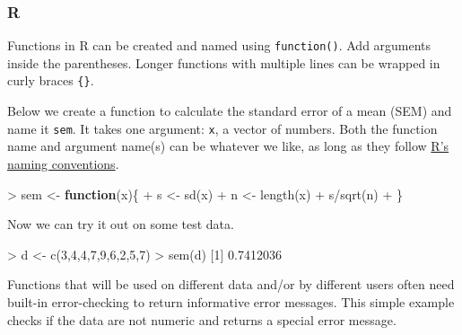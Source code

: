 \documentclass[
]{book}
\newenvironment{Shaded}{\begin{snugshade}}{\end{snugshade}}
\newcommand{\ControlFlowTok}[1]{\textcolor[rgb]{0.13,0.29,0.53}{\textbf{#1}}}
\newcommand{\DecValTok}[1]{\textcolor[rgb]{0.00,0.00,0.81}{#1}}
\newcommand{\FloatTok}[1]{\textcolor[rgb]{0.00,0.00,0.81}{#1}}
\newcommand{\FunctionTok}[1]{\textcolor[rgb]{0.00,0.00,0.00}{#1}}
\newcommand{\NormalTok}[1]{#1}
\newcommand{\OtherTok}[1]{\textcolor[rgb]{0.56,0.35,0.01}{#1}}
\newcommand{\SpecialCharTok}[1]{\textcolor[rgb]{0.00,0.00,0.00}{#1}}
\begin{document}
\hypertarget{r-7}{%
\subsubsection*{R}\label{r-7}}

Functions in R can be created and named using \texttt{function()}. Add arguments inside the parentheses. Longer functions with multiple lines can be wrapped in curly braces \texttt{\{\}}.

Below we create a function to calculate the standard error of a mean (SEM) and name it \texttt{sem}. It takes one argument: \texttt{x}, a vector of numbers. Both the function name and argument name(s) can be whatever we like, as long as they follow \href{https://cran.r-project.org/doc/manuals/r-release/R-intro.html\#R-commands_003b-case-sensitivity-etc}{R's naming conventions}.

\begin{Shaded}
\begin{Highlighting}[]
\SpecialCharTok{\textgreater{}}\NormalTok{ sem }\OtherTok{\textless{}{-}} \ControlFlowTok{function}\NormalTok{(x)\{}
\SpecialCharTok{+}\NormalTok{   s }\OtherTok{\textless{}{-}} \FunctionTok{sd}\NormalTok{(x)}
\SpecialCharTok{+}\NormalTok{   n }\OtherTok{\textless{}{-}} \FunctionTok{length}\NormalTok{(x)}
\SpecialCharTok{+}\NormalTok{   s}\SpecialCharTok{/}\FunctionTok{sqrt}\NormalTok{(n)}
\SpecialCharTok{+}\NormalTok{ \}}
\end{Highlighting}
\end{Shaded}

Now we can try it out on some test data.

\begin{Shaded}
\begin{Highlighting}[]
\SpecialCharTok{\textgreater{}}\NormalTok{ d }\OtherTok{\textless{}{-}} \FunctionTok{c}\NormalTok{(}\DecValTok{3}\NormalTok{,}\DecValTok{4}\NormalTok{,}\DecValTok{4}\NormalTok{,}\DecValTok{7}\NormalTok{,}\DecValTok{9}\NormalTok{,}\DecValTok{6}\NormalTok{,}\DecValTok{2}\NormalTok{,}\DecValTok{5}\NormalTok{,}\DecValTok{7}\NormalTok{)}
\SpecialCharTok{\textgreater{}} \FunctionTok{sem}\NormalTok{(d)}
\NormalTok{[}\DecValTok{1}\NormalTok{] }\FloatTok{0.7412036}
\end{Highlighting}
\end{Shaded}

Functions that will be used on different data and/or by different users often need built-in error-checking to return informative error messages. This simple example checks if the data are not numeric and returns a special error message.
\end{document}
